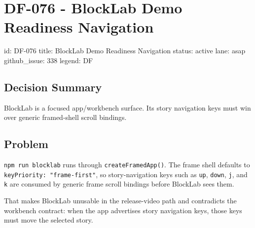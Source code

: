\chapter{DF-076 - BlockLab Demo Readiness Navigation}\label{record-116}

\smallskip

\begin{RecordMeta}
id: DF-076
title: BlockLab Demo Readiness Navigation
status: active
lane: asap
github_issue: 338
legend: DF

\end{RecordMeta}

\section{Decision Summary}\label{record-116-decision-summary}

BlockLab is a focused app/workbench surface. Its story navigation keys must win over generic framed-shell scroll bindings.

\section{Problem}\label{record-116-problem}

\texttt{n\allowbreak{}p\allowbreak{}m\allowbreak{} \allowbreak{}r\allowbreak{}u\allowbreak{}n\allowbreak{} \allowbreak{}b\allowbreak{}l\allowbreak{}o\allowbreak{}c\allowbreak{}k\allowbreak{}l\allowbreak{}a\allowbreak{}b} runs through \texttt{c\allowbreak{}r\allowbreak{}e\allowbreak{}a\allowbreak{}t\allowbreak{}e\allowbreak{}F\allowbreak{}r\allowbreak{}a\allowbreak{}m\allowbreak{}e\allowbreak{}d\allowbreak{}A\allowbreak{}p\allowbreak{}p\allowbreak{}(\allowbreak{})}. The frame shell defaults to \texttt{k\allowbreak{}e\allowbreak{}y\allowbreak{}P\allowbreak{}r\allowbreak{}i\allowbreak{}o\allowbreak{}r\allowbreak{}i\allowbreak{}t\allowbreak{}y\allowbreak{}:\allowbreak{} \allowbreak{}"\allowbreak{}f\allowbreak{}r\allowbreak{}a\allowbreak{}m\allowbreak{}e\allowbreak{}-\allowbreak{}f\allowbreak{}i\allowbreak{}r\allowbreak{}s\allowbreak{}t\allowbreak{}"}, so story-navigation keys such as \texttt{u\allowbreak{}p}, \texttt{d\allowbreak{}o\allowbreak{}w\allowbreak{}n}, \texttt{j}, and \texttt{k} are consumed by generic frame scroll bindings before BlockLab sees them.

That makes BlockLab unusable in the release-video path and contradicts the workbench contract: when the app advertises story navigation keys, those keys must move the selected story.

